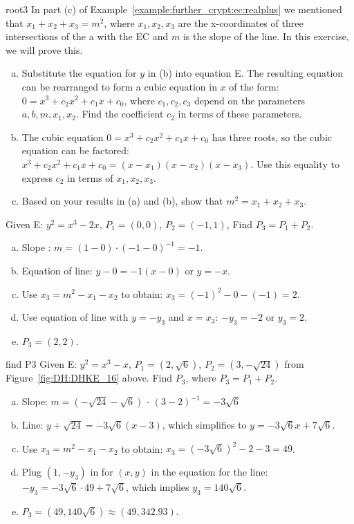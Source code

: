 \begin{exercise}{root3}
In part (c) of Example~\ref{example:further_crypt:ec:realplus} we mentioned that $x_1+x_2+x_3=m^2$, where $x_1,x_2,x_3$ are the x-coordinates of three intersections of the a with the EC and $m$ is the slope of the line.  In this exercise, we will prove this.
\begin{enumerate}[(a)]
\item
Substitute the equation for $y$ in (b) into equation E. The resulting equation can be rearranged to form a cubic equation in $x$ of the form: $0 = x^3 + c_2 x^2 + c_1 x + c_0$, where $c_1, c_2, c_3$ depend on the parameters $a,b,m,x_1,x_2$. Find the coefficient $c_2$ in terms of these parameters.
\item
The cubic equation $0 = x^3 + c_2 x^2 + c_1 x + c_0$ has three roots, so the cubic equation can be factored:  $x^3 + c_2 x^2 + c_1 x + c_0 = (x-x_1)(x-x_2)(x-x_3)$. Use this equality to express $c_2$ in terms of $x_1, x_2, x_3$.
\item
Based on your results in (a) and (b), show that $m^2 = x_1 + x_2 + x_3$.
\end{enumerate}
\end{exercise}

\begin{example}{} 
Given E: $y^2 = x^3 - 2x$, $P_1 = (0,0)$, $P_2 = (-1,1)$, Find $P_3=P_1 + P_2$.
		
\begin{enumerate}[(a)]
\item
Slope :
$ m =(1 - 0) \cdot (-1- 0)^{-1}=-1$.
\item
Equation of line:	$y - 0 = -1(x- 0)$ or $y =-x $.
\item
Use $x_3 = m^2 - x_1 - x_2$ to obtain: $x_3 = (-1)^2 - 0 - (-1) = 2$.
\item
Use equation of line with $y=-y_3$ and $x=x_3$:  $-y_3 = -2$ or $y_3=2$.
\item
$P_3 = (2,2)$.
\end{enumerate}
\end{example}
\begin{example}{find P3} Given E: $y^2 = x^3 - x$, $P_1 = (2, \sqrt{6})$, $P_2 = (3, -\sqrt{24})$ from Figure~\ref{fig:DH:DHKE_16} above.
	Find $P_3$, where $P_3 = P_1 + P_2$.
\begin{enumerate}[(a)]
\item 
Slope: $m =( -\sqrt{24}-\sqrt{6})$ $\cdot$ $(3-2)^{-1} = -3\sqrt{6}  $ \\
\item
Line: $y + \sqrt{24} = -3\sqrt{6}(x - 3)$, which simplifies to $y = -3\sqrt{6}x + 7\sqrt{6}$.
\item 
Use $x_3 = m^2 - x_1 - x_2$ to obtain: $x_3 = (-3\sqrt{6})^2 - 2 - 3 = 49$.
\item
Plug $(1,-y_3)$ in for $(x,y)$ in the equation for the line: $-y_3 = -3\sqrt{6}\cdot 49+7 \sqrt{6}$, which implies $y_3 = 140\sqrt{6}$. 
\item
$P_3 = (49,140\sqrt{6}) \approx (49,342.93)$.
\end {enumerate}  
\end{example}


